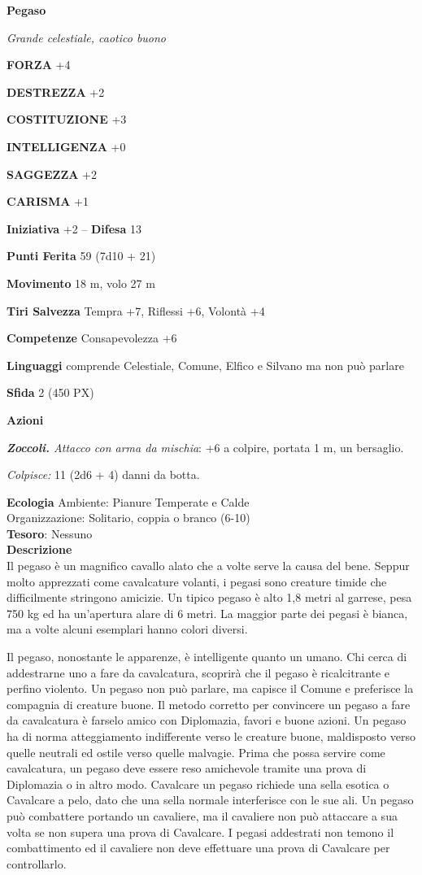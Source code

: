 \begin{multicols}{2}
	\medskip{}\textbf{Pegaso}

	\textit{Grande celestiale, caotico buono}

	\textbf{FORZA} +4

	\textbf{DESTREZZA} +2

	\textbf{COSTITUZIONE} +3

	\textbf{INTELLIGENZA} +0

	\textbf{SAGGEZZA} +2

	\textbf{CARISMA} +1

	\textbf{Iniziativa} +2 -- \textbf{Difesa} 13

	\textbf{Punti Ferita} 59 (7d10 + 21)

	\textbf{Movimento} 18 m, volo 27 m

	\textbf{Tiri Salvezza} Tempra +7, Riflessi +6, Volontà +4

	\textbf{Competenze} Consapevolezza +6

	\textbf{Linguaggi} comprende Celestiale, Comune, Elfico e Silvano ma non può parlare

	\textbf{Sfida} 2 (450 PX)

	\textbf{Azioni}

	\textit{\textbf{Zoccoli.} Attacco con arma da mischia}: +6 a colpire, portata 1 m, un bersaglio.

	\textit{Colpisce:} 11 (2d6 + 4) danni da botta.

	\textbf{Ecologia}
	Ambiente: Pianure Temperate e Calde\\
	Organizzazione: Solitario, coppia o branco (6-10)\\
	\textbf{Tesoro}: Nessuno\\
	\textbf{Descrizione}\\
	Il pegaso è un magnifico cavallo alato che a volte serve la causa del bene. Seppur molto apprezzati come cavalcature volanti, i pegasi sono creature timide che difficilmente stringono amicizie. Un tipico pegaso è alto 1,8 metri al garrese, pesa 750 kg ed ha un'apertura alare di 6 metri. La maggior parte dei pegasi è bianca, ma a volte alcuni esemplari hanno colori diversi.

	Il pegaso, nonostante le apparenze, è intelligente quanto un umano. Chi cerca di addestrarne uno a fare da cavalcatura, scoprirà che il pegaso è ricalcitrante e perfino violento. Un pegaso non può parlare, ma capisce il Comune e preferisce la compagnia di creature buone. Il metodo corretto per convincere un pegaso a fare da cavalcatura è farselo amico con Diplomazia, favori e buone azioni. Un pegaso ha di norma atteggiamento indifferente verso le creature buone, maldisposto verso quelle neutrali ed ostile verso quelle malvagie. Prima che possa servire come cavalcatura, un pegaso deve essere reso amichevole tramite una prova di Diplomazia o in altro modo. Cavalcare un pegaso richiede una sella esotica o Cavalcare a pelo, dato che una sella normale interferisce con le sue ali. Un pegaso può combattere portando un cavaliere, ma il cavaliere non può attaccare a sua volta se non supera una prova di Cavalcare. I pegasi addestrati non temono il combattimento ed il cavaliere non deve effettuare una prova di Cavalcare per controllarlo.


\end{multicols}
